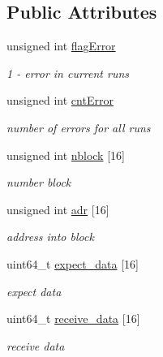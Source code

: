 \subsection*{Public Attributes}
\begin{DoxyCompactItemize}
\item 
unsigned int \hyperlink{structTaskCheckData_af9ebbb6d1c36944134542b6bf315c86e}{flagError}
\begin{DoxyCompactList}\small\item\em 1 -\/ error in current runs \item\end{DoxyCompactList}\item 
unsigned int \hyperlink{structTaskCheckData_ab0a2b9d059da356011c8f5b071bc13a6}{cntError}
\begin{DoxyCompactList}\small\item\em number of errors for all runs \item\end{DoxyCompactList}\item 
unsigned int \hyperlink{structTaskCheckData_ab30a0e66e9a6aa9bfb55971fc9305f9b}{nblock} \mbox{[}16\mbox{]}
\begin{DoxyCompactList}\small\item\em number block \item\end{DoxyCompactList}\item 
unsigned int \hyperlink{structTaskCheckData_a4c47800bf53ca101dfa00f9729937641}{adr} \mbox{[}16\mbox{]}
\begin{DoxyCompactList}\small\item\em address into block \item\end{DoxyCompactList}\item 
uint64\_\-t \hyperlink{structTaskCheckData_a331e59af2ad31c5ff815604ae66b3270}{expect\_\-data} \mbox{[}16\mbox{]}
\begin{DoxyCompactList}\small\item\em expect data \item\end{DoxyCompactList}\item 
uint64\_\-t \hyperlink{structTaskCheckData_a9cec8fbf8e93cd5cd5569a5cb67d0556}{receive\_\-data} \mbox{[}16\mbox{]}
\begin{DoxyCompactList}\small\item\em receive data \item\end{DoxyCompactList}\end{DoxyCompactItemize}


